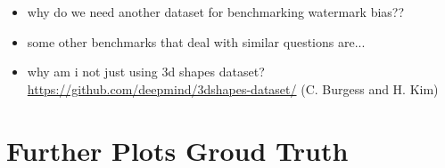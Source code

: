 \begin{itemize}
    \item why do we need another dataset for benchmarking watermark bias??
    \item some other benchmarks that deal with similar questions are...
    \item why am i not just using 3d shapes dataset? \url{https://github.com/deepmind/3dshapes-dataset/} (C. Burgess and H. Kim)
\end{itemize}

\section{Further Plots Groud Truth}
